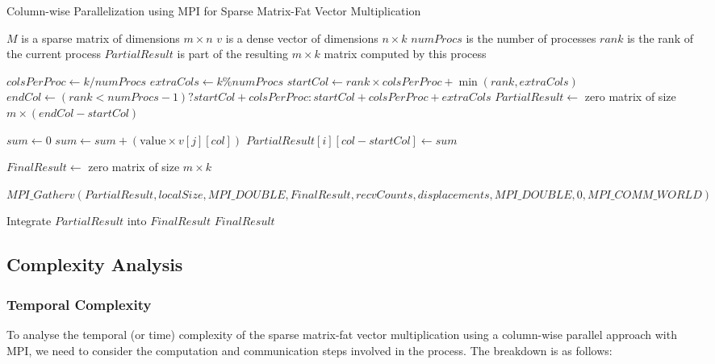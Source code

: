 \documentclass[12pt,oneside]{book} %
\begin{document}
\begin{algorithm}
    \caption{Column-wise Parallelization using MPI for Sparse Matrix-Fat Vector Multiplication}
    \begin{algorithmic}
        \Require $M$ is a sparse matrix of dimensions $m \times n$
        \Require $v$ is a dense vector of dimensions $n \times k$
        \Require $numProcs$ is the number of processes
        \Require $rank$ is the rank of the current process
        \Ensure $PartialResult$ is part of the resulting $m \times k$ matrix computed by this process

        \State $colsPerProc \gets k / numProcs$
        \State $extraCols \gets k \% numProcs$
        \State $startCol \gets rank \times colsPerProc + \min(rank, extraCols)$
        \State $endCol \gets (rank < numProcs - 1) ? startCol + colsPerProc : startCol + colsPerProc + extraCols$
        \State $PartialResult \gets$ zero matrix of size $m \times (endCol - startCol)$

        \State $sum \gets 0$
        \State $sum \gets sum + (\text{value} \times v[j][col])$
        \EndFor
        \State $PartialResult[i][col - startCol] \gets sum$
        \EndFor
        \EndFor

        \State $FinalResult \gets$ zero matrix of size $m \times k$
        \EndIf

        \State $MPI\_Gatherv(PartialResult, localSize, MPI\_DOUBLE, FinalResult, recvCounts, displacements, MPI\_DOUBLE, 0, MPI\_COMM\_WORLD)$

        \State Integrate $PartialResult$ into $FinalResult$
        \Return $FinalResult$
        \EndIf
    \end{algorithmic}
\end{algorithm}

\subsection{Complexity Analysis}
\subsubsection{Temporal Complexity}

To analyse the temporal (or time) complexity of the sparse matrix-fat vector
multiplication using a column-wise parallel approach with MPI, we need to
consider the computation and communication steps involved in the process. The
breakdown is as follows:
\end{document}
